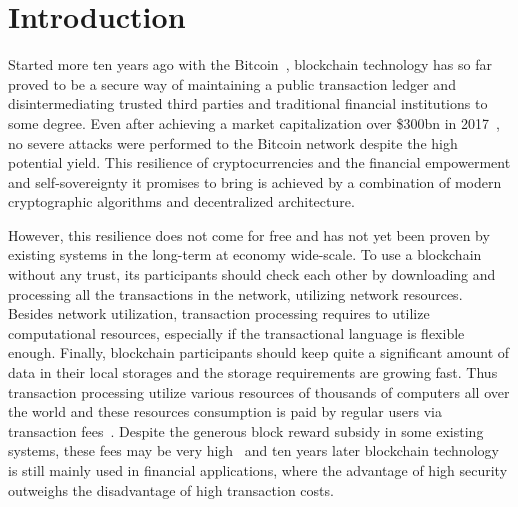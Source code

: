 \section{Introduction}
\label{sec:intro}


Started more ten years ago with the Bitcoin~\cite{nakamoto2008bitcoin}, blockchain technology has so far proved
to be a secure way of maintaining a public transaction ledger and disintermediating trusted third parties and
traditional financial institutions to some degree.
Even after achieving a market capitalization over \$300bn in 2017~\cite{btcPrice},
no severe attacks were performed to the Bitcoin network despite the high potential yield.
This resilience of cryptocurrencies and the financial empowerment and self-sovereignty it promises to bring is
achieved by a combination of modern cryptographic algorithms and decentralized architecture.

However, this resilience does not come for free and has not yet been proven by existing systems in the long-term at economy wide-scale.
To use a blockchain without any trust, its participants should check each other by downloading and
processing all the transactions in the network, utilizing network resources.
Besides network utilization, transaction processing requires to utilize computational resources,
especially if the transactional language is flexible enough.
Finally, blockchain participants should keep quite a significant amount of data in their local storages and
the storage requirements are growing fast.
Thus transaction processing utilize various resources of thousands of computers all over the world
and these resources consumption is paid by regular users via transaction fees~\cite{chepurnoy2018systematic}.
Despite the generous block reward subsidy in some existing systems, these fees may be very high~\cite{bitcoinFees}
and ten years later blockchain technology is still mainly used in financial applications, where the advantage of
high security outweighs the disadvantage of high transaction costs.

